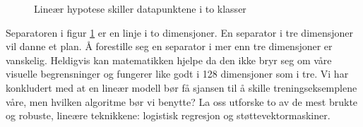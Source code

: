 \begin{figure}[h!]
\centering
{}
\caption{Lineær hypotese skiller datapunktene i to klasser}
\label{figure:separator}
\end{figure}
Separatoren i figur \ref{figure:separator} er en linje i to dimensjoner. En separator i tre dimensjoner vil danne et plan. Å forestille seg en separator i mer enn tre dimensjoner er vanskelig. Heldigvis kan matematikken hjelpe da den ikke bryr seg om våre visuelle begrensninger og fungerer like godt i 128 dimensjoner som i tre. Vi har konkludert med at en lineær modell bør få sjansen til å skille treningseksemplene våre, men hvilken algoritme bør vi benytte? La oss utforske to av de mest brukte og robuste, lineære teknikkene: logistisk regresjon og støttevektormaskiner.\\\\
